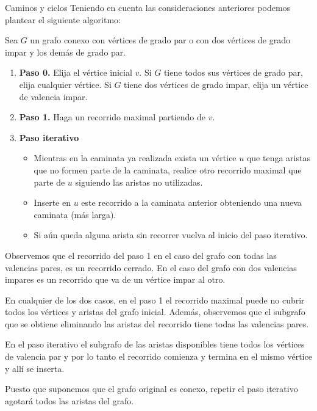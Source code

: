 \begin{section}{Caminos y ciclos}
Teniendo en cuenta las consideraciones anteriores podemos plantear el siguiente algoritmo:

Sea $G$ un grafo conexo con vértices de grado par o con dos vértices de grado impar y los demás de grado par. 

\begin{enumerate}
    \item \textbf{Paso 0.} Elija el vértice inicial $v$. Si $G$  tiene todos sus vértices de grado par,  elija cualquier vértice. Si $G$ tiene dos vértices de grado impar,  elija un vértice de valencia impar.
    \item \textbf{Paso 1.} Haga un recorrido maximal partiendo de $v$. 
    
    \item \textbf{Paso iterativo} 
    \begin{itemize}
        \item Mientras en la caminata ya realizada exista un vértice $u$  que tenga aristas que no formen parte de la caminata, realice otro recorrido maximal que parte de $u$ siguiendo las aristas no utilizadas. 
        \item Inserte en $u$ este recorrido a la caminata  anterior obteniendo una nueva caminata (más larga).
        \item  Si aún queda alguna arista sin recorrer vuelva al inicio del paso iterativo.
    \end{itemize}
\end{enumerate}

Observemos que el recorrido del paso 1 en el caso del grafo con todas las valencias pares, es un recorrido cerrado. En el caso del grafo con dos valencias impares es un recorrido que va de un vértice impar al otro.  
    
En  cualquier de los dos casos,  en el paso 1 el recorrido maximal puede no cubrir todos los vértices y aristas del grafo inicial. Además,  observemos que el subgrafo que se obtiene eliminando las aristas del recorrido tiene todas las valencias pares. 

En  el paso iterativo el subgrafo de las aristas disponibles tiene todos los vértices de valencia par y por lo tanto el recorrido comienza y  termina en el mismo vértice y allí se inserta.

Puesto que suponemos que el grafo original es conexo, repetir el paso iterativo agotará todos las aristas del grafo.

\begin{comment}
El  algoritmo es el siguiente: 
\begin{enumerate}
    \item \textbf{Paso 1.} Elija cualquier vértice  inicial $v$ y haga una caminata  que no repita aristas y  que vuelva al vértice (de $v$ a $v$). 
    

\end{comment}
\end{section}
